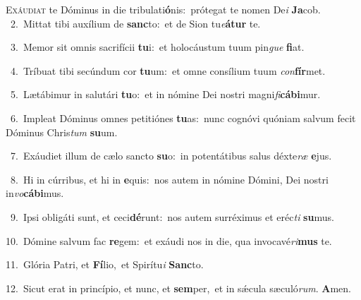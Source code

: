 \lettrine{\initial\textcolor{\initialcolor}{E}}{xáudiat} te Dóminus in die tribulati\-\textbf{ó}\-nis:~\star prótegat te nomen De\textit{i} \textbf{Ja}\-cob.\\
{\numbfont\textcolor{\numbcolor}{~2.}}~Mittat tibi auxílium de \textbf{sanc}\-to:~\star et de Sion tu\-\textit{e}\-\textbf{á}\textbf{tur} te.\par
{\numbfont\textcolor{\numbcolor}{~3.}}~Memor sit omnis sacrifícii \textbf{tu}\-i:~\star et holocáustum tuum pin\textit{gue} \textbf{fi}\-at.\par
{\numbfont\textcolor{\numbcolor}{~4.}}~Tríbuat tibi secúndum cor \textbf{tu}\-um:~\star et omne consílium tuum \textit{con}\-\textbf{fír}met.\par
{\numbfont\textcolor{\numbcolor}{~5.}}~Lætábimur in salutári \textbf{tu}\-o:~\star et in nómine Dei nostri magni\-\textit{fi}\-\textbf{cá}\textbf{bi}mur.\par
{\numbfont\textcolor{\numbcolor}{~6.}}~Impleat Dóminus omnes petitiónes \textbf{tu}\-as:~\star nunc cognóvi quóniam salvum fecit Dóminus Chris\textit{tum} \textbf{su}\-um.\par
{\numbfont\textcolor{\numbcolor}{~7.}}~Exáudiet illum de cælo sancto \textbf{su}\-o:~\star in potentátibus salus déxte\textit{ræ} \textbf{e}\-jus.\par
{\numbfont\textcolor{\numbcolor}{~8.}}~Hi in cúrribus, et hi in \textbf{e}\-quis:~\star nos autem in nómine Dómini, Dei nostri in\-\textit{vo}\-\textbf{cá}\textbf{bi}mus.\par
{\numbfont\textcolor{\numbcolor}{~9.}}~Ipsi obligáti sunt, et ceci\-\textbf{dé}\-runt:~\star nos autem surréximus et eréc\textit{ti} \textbf{su}\-mus.\par
{\numbfont\textcolor{\numbcolor}{10.}}~Dómine salvum fac \textbf{re}\-gem:~\star et exáudi nos in die, qua invocavé\-\textit{ri}\-\textbf{mus} te.\par
{\numbfont\textcolor{\numbcolor}{11.}}~Glória Patri, et \textbf{Fí}\-lio,~\star et Spirítu\textit{i} \textbf{Sanc}\-to.\par
{\numbfont\textcolor{\numbcolor}{12.}}~Sicut erat in princípio, et nunc, et \textbf{sem}\-per,~\star et in sǽcula sæculó\-\textit{rum}\-. \textbf{A}\-men.\par
